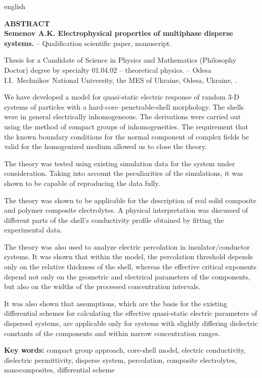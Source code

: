 \documentclass[twoside,a4paper,14pt]{vakaref-utf8}
\begin{document}
\bigskip

\begin{otherlanguage*}{english}
\begin{center}
		{\normalfont \textbf{
			ABSTRACT\\
			Semenov A.K. Electrophysical properties of multiphase disperse systems.} -- Qualification scientific paper, manuscript.}
\end{center}
\vskip 5pt

Thesis for a Candidate of Science in Physics and Mathematics (Philosophy Doctor) degree by specialty 01.04.02 -- theoretical physics. -- Odesa I.I.~Mechnikov National University, the MES of Ukraine, Odesa, Ukraine, \the\year.

\vskip 5pt

We have developed a model for quasi-static electric response of random 3-D  systems of particles with a hard-core--penetrable-shell morphology. The shells were in general electrically inhomogeneous. The derivations were carried out using the method of compact groups of inhomogeneities. The requirement that the known boundary conditions for the normal component of complex fields be valid for the homogenized medium allowed us to close the theory.

The theory was tested using existing simulation data for the system under consideration. Taking into account the peculiarities of the simulations, it was shown to be capable of reproducing the data fully.

The theory was shown to be applicable for the description of real solid composite and polymer composite electrolytes. A physical interpretation was discussed of different parts of the shell’s conductivity profile obtained by fitting the experimental data.

The theory was also used to analyze electric percolation in insulator/con\-ductor  systems. It was shown that within the model, the percolation threshold depends only on the relative thickness of the shell, whereas the effective critical exponents depend not only on the geometric and electrical parameters of the components, but also on the widths of the processed concentration intervals.

It was also shown that assumptions, which are the basis for the existing differential schemes for calculating the effective quasi-static electric parameters of dispersed systems, are applicable only for systems with slightly differing dielectric constants of the components and within narrow concentration ranges.

\vskip 10pt
\textbf{Key words:} compact group approach, core-shell model, electric conductivity, dielectric permittivity, disperse system, percolation, composite electrolytes, nanocomposites, differential scheme
	
\end{otherlanguage*}
\end{document}
